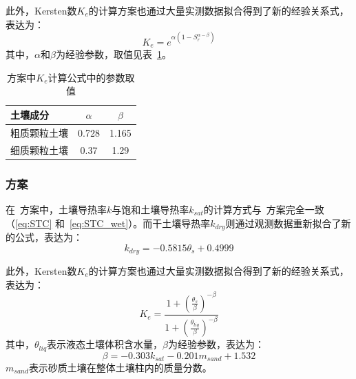 此外，Kersten数$K_e$的计算方案也通过大量实测数据拟合得到了新的经验关系式，表达为：
$$K_e=e^{\alpha\left(1-S_r^{\alpha-\beta}\right)}$$
其中，$\alpha$和$\beta$为经验参数，取值见表~\ref{tab:lu2007方案中Ke参数取值}。
{
\begin{table}[htbp]
    \centering
    \caption{\citet{lu2007improved}方案中$K_e$计算公式中的参数取值}
    \label{tab:lu2007方案中Ke参数取值}
    \begin{tabular}{@{}lcc@{}}
    \toprule
    土壤成分               & $\alpha$     & $\beta$  \\
    \midrule
    粗质颗粒土壤                  & 0.728      & 1.165  \\
    细质颗粒土壤                  & 0.37    & 1.29   \\
    \bottomrule
    \end{tabular}
\end{table}
}


\subsubsection{\citet{Yan2019thermal}方案}
在~\citet{Yan2019thermal}方案中，土壤导热率$k$与饱和土壤导热率$k_{sat}$的计算方式与~\citet{Johansen1975}方案完全一致（\eqref{eq:STC} 和~\eqref{eq:STC_wet}）。而干土壤导热率$k_{dry}$则通过观测数据重新拟合了新的公式，表达为：
\begin{equation}\label{eq:STC_dry_Yan}
k_{dry}=-0.5815\theta_s + 0.4999
\end{equation}

此外，Kersten数$K_e$的计算方案也通过大量实测数据拟合得到了新的经验关系式，表达为：$$K_e=\frac{1+\left(\frac{\theta_s}{\beta}\right)^{-\beta}}{1+\left(\frac{\theta_{liq}}{\beta}\right)^{-\beta}}$$
其中，$\theta_{liq}$表示液态土壤体积含水量，$\beta$为经验参数，表达为：$$\beta = -0.303k_{sat} - 0.201m_{sand} + 1.532$$
$m_{sand}$表示砂质土壤在整体土壤柱内的质量分数。

